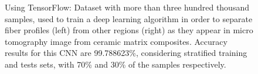 

\begin{figure}[!t]
\centering
{}
{}
\caption{Using TensorFlow: Dataset with more than three hundred thousand samples, used to train a deep
learning algorithm in order to separate fiber profiles (left) from other regions (right) as they
appear in micro tomography image from ceramic matrix composites. Accuracy results for this CNN are
99.788623\%, considering stratified training and tests sets, with 70\% and 30\% of the samples
respectively.}
\label{fig:pycbir}
\end{figure}



